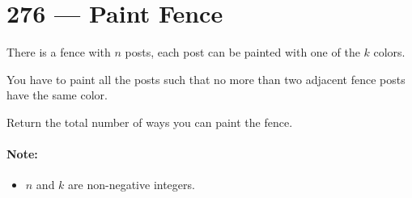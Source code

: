\section{276 --- Paint Fence}
There is a fence with $n$ posts, each post can be painted with one of the $k$ colors.
\par
You have to paint all the posts such that no more than two adjacent fence posts have the same color.
\par
Return the total number of ways you can paint the fence.
\par
\paragraph{Note:}
\begin{itemize}
\item $n$ and $k$ are non-negative integers.
\end{itemize}

